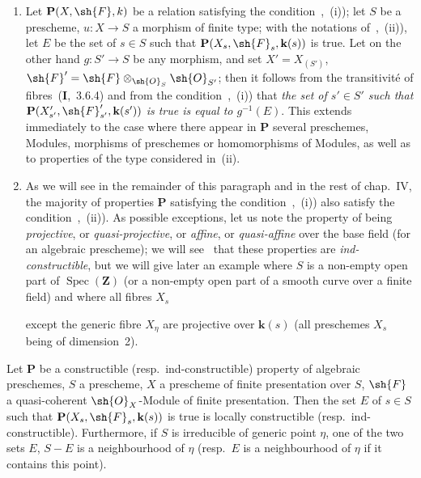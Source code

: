 \begin{remarks}[9.2.2]
\begin{enumerate}[label=(\roman*)]
  \item Let $\mathbf{P}(X,\sh{F},k)$ be a relation satisfying the condition~,~(i)); let $S$ be a prescheme, $u:X\to S$ a morphism of finite type; with the notations of~,~(ii)), let $E$ be the set of $s\in S$ such that $\mathbf{P}(X_s,\sh{F}_s,\mathbf{k}(s))$ is true.
Let on the other hand $g:S'\to S$ be any morphism, and set $X'=X_{(S')}$, $\sh{F}'=\sh{F}\otimes_{\sh{O}_S}\sh{O}_{S'}$; then it follows from the transitivit\'e of fibres~(\textbf{I},~3.6.4) and from the condition~,~(i)) that \emph{the set of $s'\in S'$ such that $\mathbf{P}(X'_{s'},\sh{F}'_{s'},\mathbf{k}(s'))$ is true is equal to $g^{-1}(E)$}.
This extends immediately to the case where there appear in $\mathbf{P}$ several preschemes, Modules, morphisms of preschemes or homomorphisms of Modules, as well as to properties of the type considered in~(ii).

  \item As we will see in the remainder of this paragraph and in the rest of chap.~IV, the majority of properties $\mathbf{P}$ satisfying the condition~,~(i)) also satisfy the condition~,~(ii)).
As possible exceptions, let us note the property of being \emph{projective}, or \emph{quasi-projective}, or \emph{affine}, or \emph{quasi-affine} over the base field (for an algebraic prescheme); we will see~ that these properties are \emph{ind-constructible}, but we will give later an example where $S$ is a non-empty open part of $\operatorname{Spec}(\mathbf{Z})$ (or a non-empty open part of a smooth curve over a finite field) and where all fibres $X_s$

except the generic fibre $X_\eta$ are projective over $\mathbf{k}(s)$ (all preschemes $X_s$ being of dimension~2).
\end{enumerate}
\end{remarks}

\begin{proposition}[9.2.3]
\label{IV.9.2.3}
Let $\mathbf{P}$ be a constructible \textnormal{(}resp.\ ind-constructible\textnormal{)} property of algebraic preschemes, $S$ a prescheme, $X$ a prescheme of finite presentation over $S$, $\sh{F}$ a quasi-coherent $\sh{O}_X$-Module of finite presentation.
Then the set $E$ of $s\in S$ such that $\mathbf{P}(X_s,\sh{F}_s,\mathbf{k}(s))$ is true is locally constructible \textnormal{(}resp.\ ind-constructible\textnormal{)}.
Furthermore, if $S$ is irreducible of generic point $\eta$, one of the two sets $E$, $S-E$ is a neighbourhood of $\eta$ \textnormal{(}resp.\ $E$ is a neighbourhood of $\eta$ if it contains this point\textnormal{)}.
\end{proposition}

